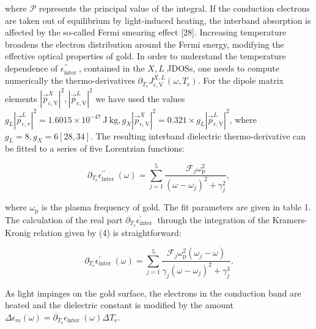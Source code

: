 \documentclass[10pt]{article}
\begin{document}
where $\mathcal{P}$ represents the principal value of the integral. If the conduction electrons are taken out of equilibrium by light-induced heating, the interband absorption is affected by the so-called Fermi smearing effect [28]. Increasing temperature broadens the electron distribution around the Fermi energy, modifying the effective optical properties of gold. In order to understand the temperature dependence of $\epsilon_{\text {inter }}^{\prime \prime}$, contained in the $X, L$ JDOSs, one needs to compute numerically the thermo-derivatives $\partial_{T_{\mathrm{e}}} J_{\mathrm{c}, \mathrm{V}}^{X, L}\left(\omega, T_{\mathrm{e}}\right)$. For the dipole matrix elements $\left|\vec{p}_{\mathrm{c}, \mathrm{V}}^{X}\right|^{2},\left|\vec{p}_{\mathrm{c}, \mathrm{V}}^{L}\right|^{2}$ we have used the values $g_{L}\left|\vec{p}_{\mathrm{c}, \mathrm{v}}^{L}\right|^{2}=1.6015 \times 10^{-47} \mathrm{~J} \mathrm{~kg}, g_{X}\left|\vec{p}_{\mathrm{c}, \mathrm{V}}^{X}\right|^{2}=0.321 \times g_{L}\left|\vec{p}_{\mathrm{c}, \mathrm{V}}^{L}\right|^{2}$, where $g_{L}=8, g_{X}=6[28,34]$. The resulting interband dielectric thermo-derivative can be fitted to a series of five Lorentzian functions:


\begin{equation*}
\partial_{T_{\mathrm{e}}} \epsilon_{\text {inter }}^{\prime \prime}(\omega)=\sum_{j=1}^{5} \frac{\mathcal{F}_{j} \omega_{\mathrm{p}}^{2}}{\left(\omega-\omega_{j}\right)^{2}+\gamma_{j}^{2}}, \tag{5}
\end{equation*}


where $\omega_{\mathrm{p}}$ is the plasma frequency of gold. The fit parameters are given in table 1. The calculation of the real part $\partial_{T_{\mathrm{e}}} \epsilon_{\text {inter }}^{\prime}$ through the integration of the Kramers-Kronig relation given by (4) is straightforward:


\begin{equation*}
\partial_{T_{\mathrm{e}}} \epsilon_{\text {inter }}^{\prime}(\omega)=\sum_{j=1}^{5} \frac{\mathcal{F}_{j} \omega_{\mathrm{p}}^{2}\left(\omega_{j}-\omega\right)}{\gamma_{j}\left(\omega-\omega_{j}\right)^{2}+\gamma_{j}^{3}} . \tag{6}
\end{equation*}


As light impinges on the gold surface, the electrons in the conduction band are heated and the dielectric constant is modified by the amount $\Delta \epsilon_{m}(\omega)=\partial_{T_{\mathrm{e}}} \epsilon_{\text {inter }}(\omega) \Delta T_{\mathrm{e}}$.
\end{document}
